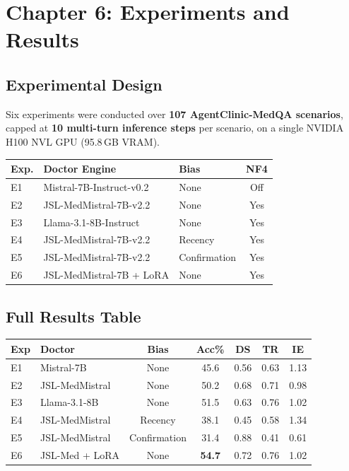 \section{Chapter 6: Experiments and Results}
\label{ch:results}

\subsection{Experimental Design}

Six experiments were conducted over \textbf{107 AgentClinic-MedQA scenarios}, capped at \textbf{10 multi-turn inference steps} per scenario, on a single NVIDIA H100 NVL GPU (95.8\,GB VRAM).

\begin{center}
\begin{tabular}{@{}lllc@{}}
\toprule
\textbf{Exp.} & \textbf{Doctor Engine} & \textbf{Bias} & \textbf{NF4} \\
\midrule
E1 & Mistral-7B-Instruct-v0.2 & None & Off \\
E2 & JSL-MedMistral-7B-v2.2 & None & Yes \\
E3 & Llama-3.1-8B-Instruct & None & Yes \\
E4 & JSL-MedMistral-7B-v2.2 & Recency & Yes \\
E5 & JSL-MedMistral-7B-v2.2 & Confirmation & Yes \\
E6 & JSL-MedMistral-7B + LoRA & None & Yes \\
\bottomrule
\end{tabular}
\end{center}

\subsection{Full Results Table}

\begin{center}
\begin{tabular}{@{}llccccc@{}}
\toprule
\textbf{Exp} & \textbf{Doctor} & \textbf{Bias} & \textbf{Acc\%} & \textbf{DS} & \textbf{TR} & \textbf{IE} \\
\midrule
E1 & Mistral-7B & None & 45.6 & 0.56 & 0.63 & 1.13 \\
E2 & JSL-MedMistral & None & 50.2 & 0.68 & 0.71 & 0.98 \\
E3 & Llama-3.1-8B & None & 51.5 & 0.63 & 0.76 & 1.02 \\
E4 & JSL-MedMistral & Recency & 38.1 & 0.45 & 0.58 & 1.34 \\
E5 & JSL-MedMistral & Confirmation & 31.4 & 0.88 & 0.41 & 0.61 \\
E6 & JSL-Med + LoRA & None & \textbf{54.7} & 0.72 & 0.76 & 1.02 \\
\bottomrule
\end{tabular}
\end{center}

